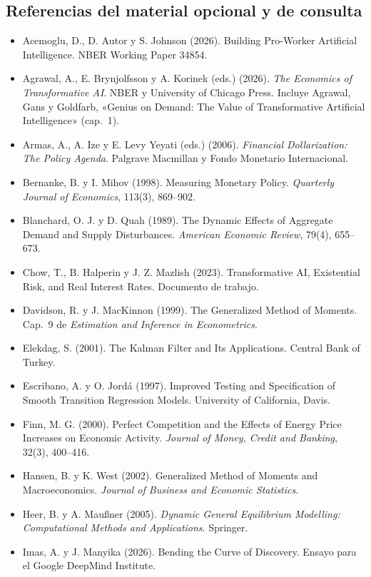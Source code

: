 \documentclass[11pt,a4paper]{article}
\begin{document}
\subsection*{Referencias del material opcional y de consulta}
{\small
\begin{itemize}[leftmargin=1.4em,itemsep=1pt,label={}]
\item Acemoglu, D., D. Autor y S. Johnson (2026). Building Pro-Worker Artificial Intelligence. NBER Working Paper 34854.
\item Agrawal, A., E. Brynjolfsson y A. Korinek (eds.) (2026). \emph{The Economics of Transformative AI}. NBER y University of Chicago Press. Incluye Agrawal, Gans y Goldfarb, «Genius on Demand: The Value of Transformative Artificial Intelligence» (cap.~1).
\item Armas, A., A. Ize y E. Levy Yeyati (eds.) (2006). \emph{Financial Dollarization: The Policy Agenda}. Palgrave Macmillan y Fondo Monetario Internacional.
\item Bernanke, B. y I. Mihov (1998). Measuring Monetary Policy. \emph{Quarterly Journal of Economics}, 113(3), 869--902.
\item Blanchard, O. J. y D. Quah (1989). The Dynamic Effects of Aggregate Demand and Supply Disturbances. \emph{American Economic Review}, 79(4), 655--673.
\item Chow, T., B. Halperin y J. Z. Mazlish (2023). Transformative AI, Existential Risk, and Real Interest Rates. Documento de trabajo.
\item Davidson, R. y J. MacKinnon (1999). The Generalized Method of Moments. Cap.~9 de \emph{Estimation and Inference in Econometrics}.
\item Elekdag, S. (2001). The Kalman Filter and Its Applications. Central Bank of Turkey.
\item Escribano, A. y O. Jordá (1997). Improved Testing and Specification of Smooth Transition Regression Models. University of California, Davis.
\item Finn, M. G. (2000). Perfect Competition and the Effects of Energy Price Increases on Economic Activity. \emph{Journal of Money, Credit and Banking}, 32(3), 400--416.
\item Hansen, B. y K. West (2002). Generalized Method of Moments and Macroeconomics. \emph{Journal of Business and Economic Statistics}.
\item Heer, B. y A. Maußner (2005). \emph{Dynamic General Equilibrium Modelling: Computational Methods and Applications}. Springer.
\item Imas, A. y J. Manyika (2026). Bending the Curve of Discovery. Ensayo para el Google DeepMind Institute.

\end{itemize}}
\end{document}
